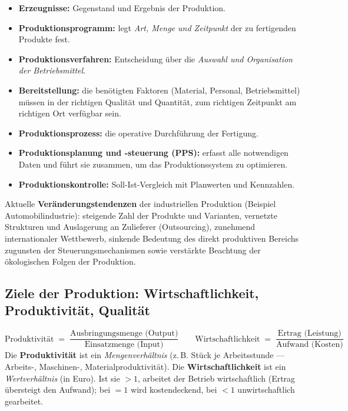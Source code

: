 \documentclass[11pt, a4paper]{article}
\begin{document}
\begin{itemize}
  \item \textbf{Erzeugnisse:} Gegenstand und Ergebnis der Produktion.
  \item \textbf{Produktionsprogramm:} legt \emph{Art, Menge und Zeitpunkt} der zu
    fertigenden Produkte fest.
  \item \textbf{Produktionsverfahren:} Entscheidung über die \emph{Auswahl und
    Organisation der Betriebsmittel}.
  \item \textbf{Bereitstellung:} die benötigten Faktoren (Material, Personal,
    Betriebsmittel) müssen in der richtigen Qualität und Quantität, zum richtigen
    Zeitpunkt am richtigen Ort verfügbar sein.
  \item \textbf{Produktionsprozess:} die operative Durchführung der Fertigung.
  \item \textbf{Produktionsplanung und -steuerung (PPS):} erfasst alle notwendigen Daten
    und führt sie zusammen, um das Produktionssystem zu optimieren.
  \item \textbf{Produktionskontrolle:} Soll-Ist-Vergleich mit Planwerten und Kennzahlen.
\end{itemize}

Aktuelle \textbf{Veränderungstendenzen} der industriellen Produktion (Beispiel
Automobilindustrie): steigende Zahl der Produkte und Varianten, vernetzte Strukturen und
Auslagerung an Zulieferer (Outsourcing), zunehmend internationaler Wettbewerb, sinkende
Bedeutung des direkt produktiven Bereichs zugunsten der Steuerungsmechanismen sowie
verstärkte Beachtung der ökologischen Folgen der Produktion.

\subsection{Ziele der Produktion: Wirtschaftlichkeit, Produktivität, Qualität}

\begin{merksatz}[title={\bfseries Formeln: Produktivität und Wirtschaftlichkeit}]
\[
\text{Produktivität} \;=\; \frac{\text{Ausbringungsmenge (Output)}}{\text{Einsatzmenge (Input)}}
\qquad
\text{Wirtschaftlichkeit} \;=\; \frac{\text{Ertrag (Leistung)}}{\text{Aufwand (Kosten)}}
\]
Die \textbf{Produktivität} ist ein \emph{Mengenverhältnis} (z.\,B. Stück je
Arbeitsstunde --- Arbeits-, Maschinen-, Materialproduktivität). Die
\textbf{Wirtschaftlichkeit} ist ein \emph{Wertverhältnis} (in Euro). Ist sie
$> 1$, arbeitet der Betrieb wirtschaftlich (Ertrag übersteigt den Aufwand); bei
$= 1$ wird kostendeckend, bei $< 1$ unwirtschaftlich gearbeitet.
\end{merksatz}
\end{document}
